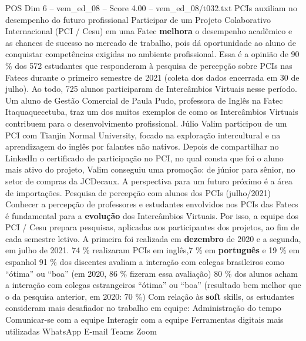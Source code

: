 \begin{textsample}{POS Dim 6 – vem\_ed\_08 – Score 4.00 – vem\_ed\_08/t032.txt}  \label{ex:f6_pos_061}
PCIs auxiliam no desempenho do futuro profissional Participar de um Projeto Colaborativo Internacional (PCI / Cesu) em uma Fatec \textbf{melhora} o desempenho acadêmico e as chances de sucesso no mercado de trabalho, pois dá oportunidade ao aluno de conquistar competências exigidas no ambiente profissional.
Essa é a opinião de 90 \% dos 572 estudantes que responderam à pesquisa de percepção sobre PCIs nas Fatecs durante o primeiro semestre de 2021 (coleta dos dados encerrada em 30 de julho).
Ao todo, 725 alunos participaram de Intercâmbios Virtuais nesse período.
Um aluno de Gestão Comercial de Paula Pudo, professora de Inglês na Fatec Itaquaquecetuba, traz um dos muitos exemplos de como os Intercâmbios Virtuais contribuem para o desenvolvimento profissional.
Júlio Valim participou de um PCI com Tianjin Normal University, focado na exploração intercultural e na aprendizagem do inglês por falantes não nativos.
Depois de compartilhar no LinkedIn o certificado de participação no PCI, no qual consta que foi o aluno mais ativo do projeto, Valim conseguiu uma promoção: de júnior para sênior, no setor de compras da JCDecaux.
A perspectiva para um futuro próximo é a área de importações.
Pesquisa de percepção com alunos dos PCIs (julho/2021) Conhecer a percepção de professores e estudantes envolvidos nos PCIs das Fatecs é fundamental para a \textbf{evolução} dos Intercâmbios Virtuais.
Por isso, a equipe dos PCI / Cesu prepara pesquisas, aplicadas aos participantes dos projetos, ao fim de cada semestre letivo.
A primeira foi realizada em \textbf{dezembro} de 2020 e a segunda, em julho de 2021. 74 \% realizaram PCIs em inglês,7 \% em \textbf{português} e 19 \% em espanhol 91 \% dos discentes avaliam a interação com colegas brasileiros como “ótima” ou “boa” (em 2020, 86 \% fizeram essa avaliação) 80 \% dos alunos acham a interação com colegas estrangeiros “ótima” ou “boa” (resultado bem melhor que o da pesquisa anterior, em 2020: 70 \%) Com relação às \textbf{soft} skills, os estudantes consideram mais desafiador no trabalho em equipe: Administração do tempo Comunicar-se com a equipe Interagir com a equipe Ferramentas digitais mais utilizadas WhatsApp E-mail Teams Zoom

\end{textsample}
